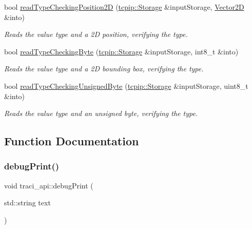 \begin{Indent}
\begin{DoxyCompactItemize}
bool \hyperlink{namespacetraci__api_a26421201e19b2667e198708c2216ca06}{read\+Type\+Checking\+Position2D} (\hyperlink{classtcpip_1_1_storage}{tcpip\+::\+Storage} \&input\+Storage, \hyperlink{class_vector2_d}{Vector2D} \&into)
\begin{DoxyCompactList}\small\item\em Reads the value type and a 2D position, verifying the type. \end{DoxyCompactList}\item 
bool \hyperlink{namespacetraci__api_aee58441392da7b83ecd8c8831271e945}{read\+Type\+Checking\+Byte} (\hyperlink{classtcpip_1_1_storage}{tcpip\+::\+Storage} \&input\+Storage, int8\+\_\+t \&into)
\begin{DoxyCompactList}\small\item\em Reads the value type and a 2D bounding box, verifying the type. \end{DoxyCompactList}\item 
bool \hyperlink{namespacetraci__api_ac95893093cb3b220faafd74ce62abba3}{read\+Type\+Checking\+Unsigned\+Byte} (\hyperlink{classtcpip_1_1_storage}{tcpip\+::\+Storage} \&input\+Storage, uint8\+\_\+t \&into)
\begin{DoxyCompactList}\small\item\em Reads the value type and an unsigned byte, verifying the type. \end{DoxyCompactList}\end{DoxyCompactItemize}
\end{Indent}


\subsection{Function Documentation}
\mbox{\label{namespacetraci__api_a8179b41c12626fc5444d12ee3a6f19cb}} 
\subsubsection{\texorpdfstring{debug\+Print()}{debugPrint()}}
{\footnotesize\ttfamily void traci\+\_\+api\+::debug\+Print (\begin{DoxyParamCaption}\item[{std\+::string}]{text }\end{DoxyParamCaption})}



